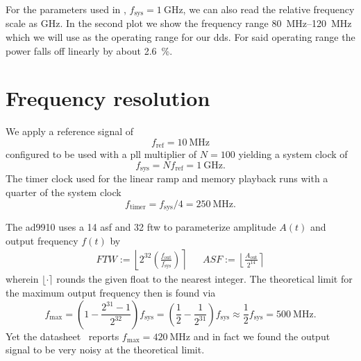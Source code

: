 For the parameters used in ,
$f_\text{sys}=\SI{1}{\giga\hertz}$, we can also read the relative frequency
scale as \si{\giga\hertz}. In the second plot we show the frequency range
\SIrange{80}{120}{\mega\hertz} which we will use as the operating range
for our \gls{dds}. For said operating range the power falls off linearly by
about \SI{2.6}{\percent}.

\section{Frequency resolution}

We apply a reference signal of
\begin{equation}
  f_\text{ref}=\SI{10}{\mega\hertz}
\end{equation}
configured to be used with a \gls{pll} multiplier of
$N=100$ yielding a system clock of
\begin{equation}
  f_\text{sys}=Nf_\text{ref}=\SI{1}{\giga\hertz}.
\end{equation}
The timer clock used for the linear ramp and memory playback runs with
a quarter of the system clock
\begin{equation}
  f_\text{timer}=f_\text{sys}/4=\SI{250}{\mega\hertz}.
\end{equation}

The \gls{ad9910} uses a \SI{14}{\bit} \gls{asf} and \SI{32}{\bit} \gls{ftw}
to parameterize amplitude $A(t)$ and output frequency $f(t)$ by
\begin{align}
  FTW
  :=
  \left\lfloor2^{32}\left(\frac{f_\text{out}}{f_\text{sys}}\right)\right\rceil
  &&
  ASF
  :=
  \left\lfloor\frac{A_\text{out}}{2^{14}}\right\rceil
  \label{eq:elec:ftwasf}
\end{align}
wherein $\lfloor{\cdot}\rceil$ rounds the given float to the nearest integer.
The theoretical limit for the maximum output frequency then is found via
\begin{equation*}
  f_\text{max}
  =
  \left(1-\frac{2^{31}-1}{2^{32}}\right)f_\text{sys}
  =
  \left(\frac{1}{2}-\frac{1}{2^{31}}\right)f_\text{sys}
  \approx
  \frac{1}{2}f_\text{sys}
  =
  \SI{500}{\mega\hertz}.
\end{equation*}
Yet the datasheet~\cite{AD9910} reports $f_\text{max}=\SI{420}{\mega\hertz}$
and in fact we found the output signal to be very noisy at the theoretical
limit.

